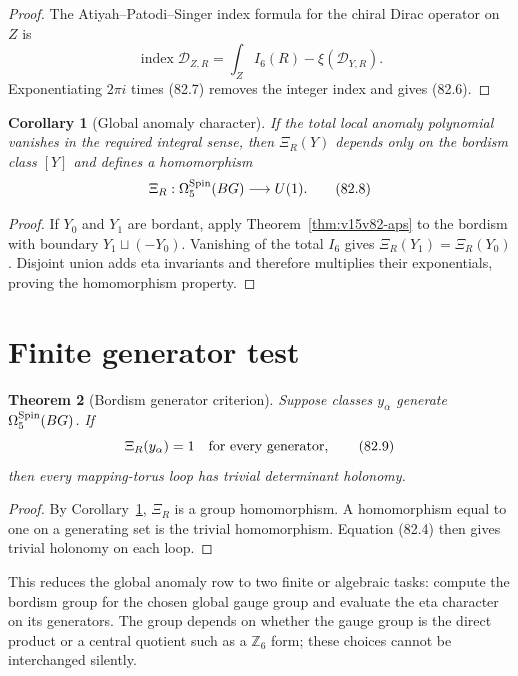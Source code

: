 \documentclass[11pt]{article}
\newtheorem{theorem}{Theorem}[section]
\newtheorem{corollary}[theorem]{Corollary}
\theoremstyle{remark}
\begin{document}
\begin{proof}
The Atiyah--Patodi--Singer index formula for the chiral Dirac
operator on \(Z\) is
\[
 \operatorname{index}{\mathscr D}_{Z,R}
 =
 \int_ZI_6(R)-\xi({\mathscr D}_{Y,R}).                 \tag{82.7}
\]
Exponentiating \(2\pi i\) times (82.7) removes the integer index
and gives (82.6).
\end{proof}

\begin{corollary}[Global anomaly character]
\label{cor:v15v82-character}
If the total local anomaly polynomial vanishes in the required
integral sense, then \(\Xi_R(Y)\) depends only on the bordism class
\([Y]\) and defines a homomorphism
\[
 \Xi_R:\Omega^{\rm Spin}_5(BG)\longrightarrow U(1).   \tag{82.8}
\]
\end{corollary}

\begin{proof}
If \(Y_0\) and \(Y_1\) are bordant, apply
Theorem~\ref{thm:v15v82-aps} to the bordism with boundary
\(Y_1\sqcup(-Y_0)\).  Vanishing of the total \(I_6\) gives
\(\Xi_R(Y_1)=\Xi_R(Y_0)\).  Disjoint union adds eta invariants and
therefore multiplies their exponentials, proving the homomorphism
property.
\end{proof}

\section{Finite generator test}

\begin{theorem}[Bordism generator criterion]
\label{thm:v15v82-generators}
Suppose classes \(y_\alpha\) generate
\(\Omega^{\rm Spin}_5(BG)\).  If
\[
 \Xi_R(y_\alpha)=1\quad\hbox{for every generator},    \tag{82.9}
\]
then every mapping-torus loop has trivial determinant holonomy.
\end{theorem}

\begin{proof}
By Corollary~\ref{cor:v15v82-character}, \(\Xi_R\) is a group
homomorphism.  A homomorphism equal to one on a generating set is
the trivial homomorphism.  Equation (82.4) then gives trivial
holonomy on each loop.
\end{proof}

This reduces the global anomaly row to two finite or algebraic
tasks: compute the bordism group for the chosen global gauge group
and evaluate the eta character on its generators.  The group
depends on whether the gauge group is the direct product or a
central quotient such as a \(\mathbb Z_6\) form; these choices
cannot be interchanged silently.
\end{document}
